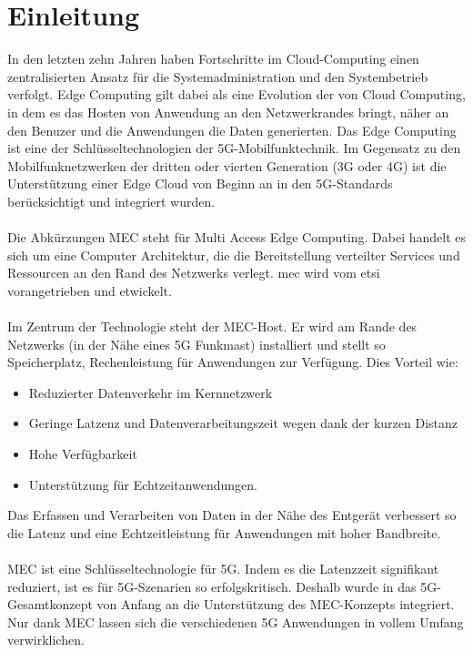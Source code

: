 \documentclass[runningheads]{llncs}
\numberwithin{figure}{section}
\begin{document}
\section{Einleitung}
\label{sec:Einleitung}
In den letzten zehn Jahren haben Fortschritte im Cloud-Computing einen zentralisierten Ansatz für die Systemadministration und den 
Systembetrieb verfolgt. Edge Computing gilt dabei als eine Evolution der von Cloud Computing, in dem es das Hosten von Anwendung an den
Netzwerkrandes bringt, näher an den Benuzer und die Anwendungen die Daten generierten. 
Das Edge Computing ist eine der Schlüsseltechnologien der 5G-Mobilfunktechnik. 
Im Gegensatz zu den Mobilfunknetzwerken der dritten oder vierten Generation (3G oder 4G) ist die Unterstützung einer Edge Cloud 
von Beginn an in den 5G-Standards berücksichtigt und integriert wurden.
\\
\\
Die Abkürzungen MEC steht für Multi Access Edge Computing. Dabei handelt es sich um eine Computer Architektur,
die die Bereitstellung verteilter Services und Ressourcen an den Rand des Netzwerks verlegt. \acrshort{mec} wird vom
\acrfull{etsi} vorangetrieben und etwickelt. 
\\
\\
Im Zentrum der Technologie steht der MEC-Host. 
Er wird am Rande des Netzwerks (in der Nähe eines 5G Funkmast) installiert und stellt so Speicherplatz, 
Rechenleistung für Anwendungen zur Verfügung. Dies Vorteil wie:
\begin{itemize}
  \item Reduzierter Datenverkehr im Kernnetzwerk
  \item Geringe Latzenz und Datenverarbeitungszeit wegen dank der kurzen Distanz
  \item Hohe Verfügbarkeit
  \item Unterstützung für Echtzeitanwendungen.
\end{itemize}
Das Erfassen und Verarbeiten von Daten in der Nähe des Entgerät verbessert so 
die Latenz und eine Echtzeitleistung für Anwendungen mit hoher Bandbreite.
\\
\\
MEC ist eine Schlüsseltechnologie für 5G. 
Indem es die Latenzzeit signifikant reduziert, ist es für 5G-Szenarien so erfolgskritisch. 
Deshalb wurde in das 5G-Gesamtkonzept von Anfang an die Unterstützung des MEC-Konzepts integriert. 
Nur dank MEC lassen sich die verschiedenen 5G Anwendungen in vollem Umfang verwirklichen.
\\
\\
\end{document}
